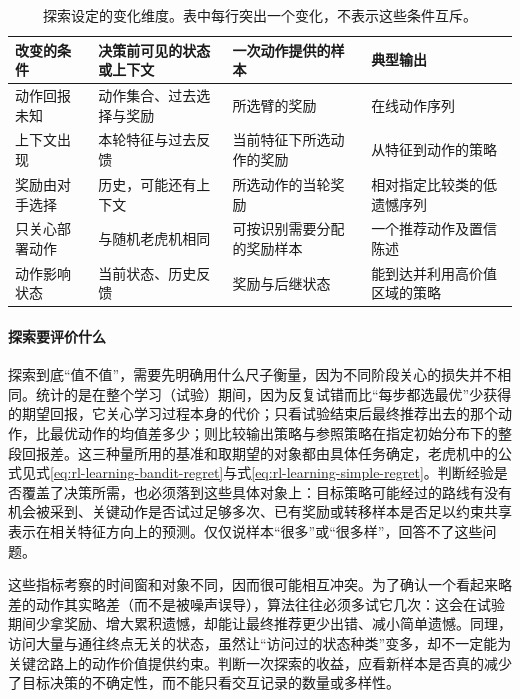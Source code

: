 \begin{table}[t]
  \centering
  \small
  \begin{tabularx}{\linewidth}{>{\raggedright\arraybackslash}p{25mm} >{\raggedright\arraybackslash}X >{\raggedright\arraybackslash}X >{\raggedright\arraybackslash}X}
    \toprule
    改变的条件 & 决策前可见的状态或上下文 & 一次动作提供的样本 & 典型输出 \\
    \midrule
    动作回报未知 & 动作集合、过去选择与奖励 & 所选臂的奖励 & 在线动作序列 \\
    上下文出现 & 本轮特征与过去反馈 & 当前特征下所选动作的奖励 & 从特征到动作的策略 \\
    奖励由对手选择 & 历史，可能还有上下文 & 所选动作的当轮奖励 & 相对指定比较类的低遗憾序列 \\
    只关心部署动作 & 与随机老虎机相同 & 可按识别需要分配的奖励样本 & 一个推荐动作及置信陈述 \\
    动作影响状态 & 当前状态、历史反馈 & 奖励与后继状态 & 能到达并利用高价值区域的策略 \\
    \bottomrule
  \end{tabularx}
  \caption{探索设定的变化维度。表中每行突出一个变化，不表示这些条件互斥。}
  \label{tab:rl-learning-exploration-settings}
\end{table}

\paragraph{探索要评价什么}
探索到底“值不值”，需要先明确用什么尺子衡量，因为不同阶段关心的损失并不相同。统计的是在整个学习（试验）期间，因为反复试错而比“每步都选最优”少获得的期望回报，它关心学习过程本身的代价；只看试验结束后最终推荐出去的那个动作，比最优动作的均值差多少；则比较输出策略与参照策略在指定初始分布下的整段回报差。这三种量所用的基准和取期望的对象都由具体任务确定，老虎机中的公式见式\eqref{eq:rl-learning-bandit-regret}与式\eqref{eq:rl-learning-simple-regret}。判断经验是否覆盖了决策所需，也必须落到这些具体对象上：目标策略可能经过的路线有没有机会被采到、关键动作是否试过足够多次、已有奖励或转移样本是否足以约束共享表示在相关特征方向上的预测。仅仅说样本“很多”或“很多样”，回答不了这些问题。

这些指标考察的时间窗和对象不同，因而很可能相互冲突。为了确认一个看起来略差的动作其实略差（而不是被噪声误导），算法往往必须多试它几次：这会在试验期间少拿奖励、增大累积遗憾，却能让最终推荐更少出错、减小简单遗憾。同理，访问大量与通往终点无关的状态，虽然让“访问过的状态种类”变多，却不一定能为关键岔路上的动作价值提供约束。判断一次探索的收益，应看新样本是否真的减少了目标决策的不确定性，而不能只看交互记录的数量或多样性。

